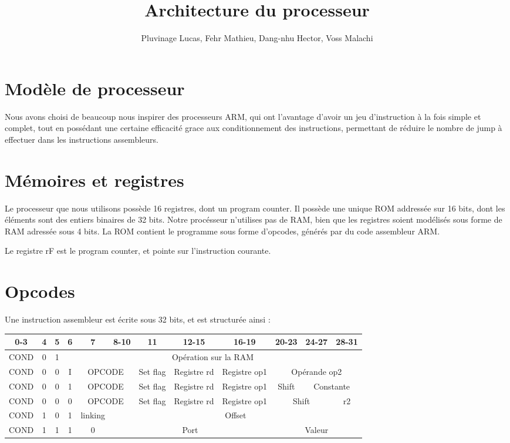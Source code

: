 \documentclass[a4paper]{article}
\title{Architecture du processeur}
\author{Pluvinage Lucas, Fehr Mathieu, Dang-nhu Hector, Voss Malachi}
\begin{document}
\maketitle

\section{Modèle de processeur}

Nous avons choisi de beaucoup nous inspirer des processeurs ARM, qui ont
l'avantage d'avoir un jeu d'instruction à la fois simple et complet, tout en
possédant une certaine efficacité grace aux conditionnement des instructions,
permettant de réduire le nombre de jump à effectuer dans les instructions
assembleurs.

\section{Mémoires et registres}

Le processeur que nous utilisons possède 16 registres, dont un program counter.
Il possède une unique ROM addressée sur 16 bits, dont les éléments sont des
entiers binaires de 32 bits. Notre procésseur n'utilises pas de RAM, bien que
les registres soient modélisés sous forme de RAM adressée sous 4 bits.
La ROM contient le programme sous forme d'opcodes, générés par du code
assembleur ARM.

Le registre rF est le program counter, et pointe sur l'instruction courante.

\section{Opcodes}

Une instruction assembleur est écrite sous 32 bits, et est structurée ainsi :

\begin{tabular}{|c|c|c|c|c|c|c|c|c|c|c|c|}
  \hline
  0-3  & 4 & 5 & 6 & 7 & 8-10 & 11 & 12-15 & 16-19 & 20-23 & 24-27 & 28-31 \\
  \hline
  COND & 0 & 1 & \multicolumn{9}{c|}{Opération sur la RAM} \\
  \hline
  COND & 0 & 0 & I & \multicolumn{2}{c|}{OPCODE} & Set flag & Registre rd & Registre op1 & \multicolumn{3}{c|}{Opérande op2}  \\
  \hline
  COND & 0 & 0 & 1 & \multicolumn{2}{c|}{OPCODE} & Set flag & Registre rd &Registre op1 & Shift & \multicolumn{2}{c|}{Constante} \\
  \hline
  COND & 0 & 0 & 0 & \multicolumn{2}{c|}{OPCODE} & Set flag & Registre rd & Registre op1 & \multicolumn{2}{c|}{Shift} & r2  \\
  \hline
  COND & 1 & 0 & 1 & linking & \multicolumn{ 7}{c|}{Offset} \\
  \hline
  COND & 1 & 1 & 1 & 0 & \multicolumn{4}{c|}{Port} & \multicolumn{3}{c|}{Valeur} \\
  \hline
\end{tabular}
\end{document}
